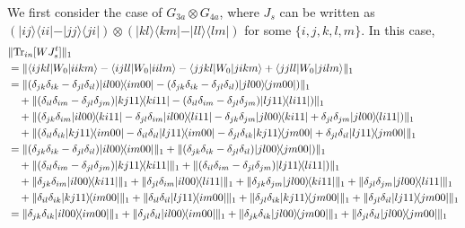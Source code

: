\documentclass[a4paper,twocolumn,accepted=2022-10-23]{quantumarticle}
\newcommand{\bra}[1]{\langle {#1} \vert}
\newcommand{\ket}[1]{\vert {#1} \rangle}
\newcommand{\ketbra}[2]{\vert {#1} \rangle\!\langle {#2} \vert}
\newcommand{\Tr}[0]{{\mathrm{Tr}}}
\theoremstyle{definition}
\begin{document}
We first consider the case of $G_{3a} \otimes G_{4a}$,
where $J_s$ can be written as $(\ketbra{ij}{ii} - \ketbra{jj}{ji}) \otimes (\ketbra{kl}{km} - \ketbra{ll}{lm} )$ for some $\{i,j,k,l,m\}$.
In this case,
\begin{align}
&\| \Tr_{in} [W J_s^t] \|_1 \notag \\
&= \| \bra{ijkl} {W_0} \ket{iikm} - \bra{ijll} {W_0} \ket{iilm} - \bra{jjkl} {W_0} \ket{jikm} + \bra{jjll} {W_0} \ket{jilm} \|_1 \\
%
&=  \| (\delta_{jk}\delta_{ik} - \delta_{jl}\delta_{il}) \ketbra{il00}{im00}
- (\delta_{jk}\delta_{ik} - \delta_{jl}\delta_{il}) \ketbra{jl00}{jm00}) \|_1 \notag \\
&\quad + \| (\delta_{il}\delta_{im} -\delta_{jl}\delta_{jm}) \ketbra{kj11}{ki11}
- (\delta_{il}\delta_{im} - \delta_{jl}\delta_{jm}) \ketbra{lj11}{li11}) \|_1 \notag \\
&\quad + \| (\delta_{jk}\delta_{im} \ketbra{il00}{ki11} - \delta_{jl}\delta_{im} \ketbra{il00}{li11}
-\delta_{jk}\delta_{jm} \ketbra{jl00}{ki11} + \delta_{jl}\delta_{jm} \ketbra{jl00}{li11} ) \|_1 \notag \\
&\quad + \| (\delta_{il}\delta_{ik} \ketbra{kj11}{im00} - \delta_{il}\delta_{il} \ketbra{lj11}{im00}
-\delta_{jl}\delta_{ik} \ketbra{kj11}{jm00} + \delta_{jl}\delta_{il} \ketbra{lj11}{jm00} \|_1 \\
%
&=  \| (\delta_{jk}\delta_{ik} - \delta_{jl}\delta_{il}) \ketbra{il00}{im00} \|_1
+ \| (\delta_{jk}\delta_{ik} - \delta_{jl}\delta_{il}) \ketbra{jl00}{jm00}) \|_1 \notag \\
&\quad + \| (\delta_{il}\delta_{im} -\delta_{jl}\delta_{jm}) \ketbra{kj11}{ki11} \|_1
+ \| (\delta_{il}\delta_{im} - \delta_{jl}\delta_{jm}) \ketbra{lj11}{li11}) \|_1 \notag \\
&\quad + \| \delta_{jk}\delta_{im} \ketbra{il00}{ki11} \|_1 + \| \delta_{jl}\delta_{im} \ketbra{il00}{li11} \|_1
+ \| \delta_{jk}\delta_{jm} \ketbra{jl00}{ki11} \|_1 + \| \delta_{jl}\delta_{jm} \ketbra{jl00}{li11} \|_1 \notag \\
&\quad + \| \delta_{il}\delta_{ik} \ketbra{kj11}{im00} \|_1 + \| \delta_{il}\delta_{il} \ketbra{lj11}{im00} \|_1
+ \| \delta_{jl}\delta_{ik} \ketbra{kj11}{jm00} \|_1 + \| \delta_{jl}\delta_{il} \ketbra{lj11}{jm00} \|_1 \\
%
&=  \| \delta_{jk}\delta_{ik} \ketbra{il00}{im00} \|_1 + \| \delta_{jl}\delta_{il} \ketbra{il00}{im00} \|_1
+ \| \delta_{jk}\delta_{ik} \ketbra{jl00}{jm00} \|_1 + \| \delta_{jl}\delta_{il} \ketbra{jl00}{jm00} \|_1 \notag \\

\end{align}
\end{document}
